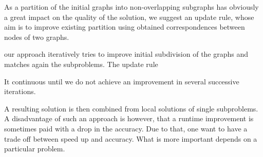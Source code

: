 As a partition of the initial graphs into non-overlapping subgraphs has obviously a great impact on the quality of the solution, we suggest an update rule, whose aim is to improve existing partition using obtained correspondences between nodes of two graphs.

our approach iteratively tries to improve initial subdivision of the graphs and matches again the subproblems. The update rule 


It continuous until we do not achieve an improvement in several successive iterations.


 A resulting solution is then combined from local solutions of single subproblems. A disadvantage of such an approach is however, that a runtime improvement is sometimes paid with a drop in the accuracy.
Due to that, one want to have a trade off between speed up and accuracy. What is more important depends on a particular problem.